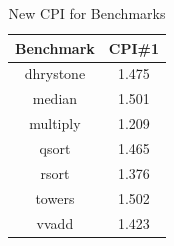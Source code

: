 \begin{table}[ht]
\caption{New CPI for Benchmarks}
\centering
\begin{tabular}{c c}
\hline\hline
Benchmark & CPI\#1 \\ [0.5ex]
\hline
dhrystone & 1.475 \\
median & 1.501 \\
multiply & 1.209 \\
qsort & 1.465 \\
rsort & 1.376 \\
towers & 1.502 \\
vvadd & 1.423 \\
[1ex]
\hline
\end{tabular}
\end{table}

